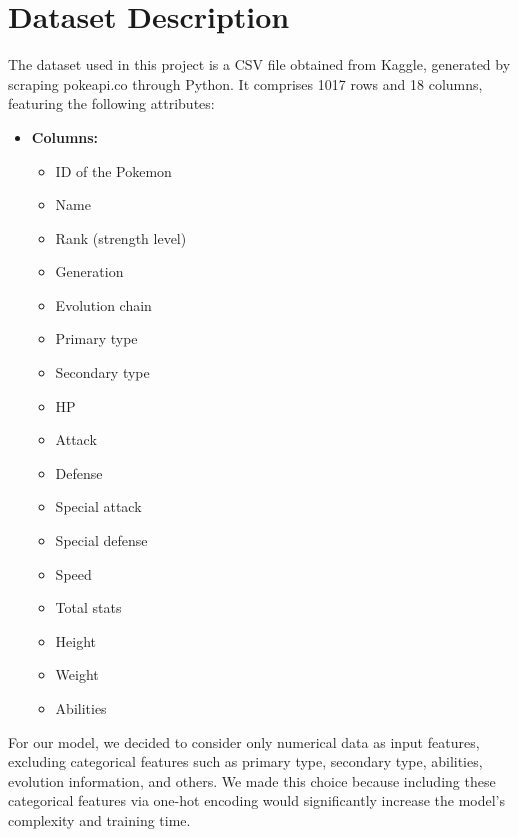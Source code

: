 \documentclass[11pt, letterpaper]{report}
\begin{document}
    \chapter{Dataset Description}
  The dataset used in this project is a CSV file obtained from Kaggle, generated by scraping pokeapi.co through Python. It comprises 1017 rows and 18 columns, featuring the following attributes:

\begin{itemize}
    \item \textbf{Columns:} 
    \begin{itemize}
        \item ID of the Pokemon
        \item Name
        \item Rank (strength level)
        \item Generation
        \item Evolution chain
        \item Primary type
        \item Secondary type
        \item HP
        \item Attack
        \item Defense
        \item Special attack
        \item Special defense
        \item Speed
        \item Total stats
        \item Height
        \item Weight
        \item Abilities
    \end{itemize}
\end{itemize}

For our model, we decided to consider only numerical data as input features, excluding categorical features such as primary type, secondary type, abilities, evolution information, and others. We made this choice because including these categorical features via one-hot encoding would significantly increase the model's complexity and training time.
\end{document}
